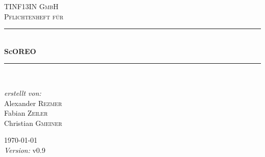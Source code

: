\begin{titlepage}

\begin{center}



\textsc{\LARGE TINF13IN GmbH}\\[2cm]

\textsc{\Large Pflichtenheft für}\\[1 cm]


\newcommand{\HRule}{\rule{\linewidth}{0.5mm}}
\HRule \\[0.4cm]
{\fontsize{60}{65} \bfseries \selectfont ScOREO}\\ [0.4cm]

\HRule \\[2.5cm]

\begin{minipage}{0.4\textwidth}
\begin{flushleft} 
\end{flushleft}
\end{minipage}
\hfill
\begin{minipage}{0.4\textwidth}
\begin{flushright} \large
\emph{erstellt von:} \\
Alexander \textsc{Rezmer}\\
Fabian \textsc{Zeiler}\\
Christian \textsc{Gmeiner}
\end{flushright}
\end{minipage}

\vfill

\large
{\large \today\\
\emph{Version:} v0.9}

\end{center}

\end{titlepage}